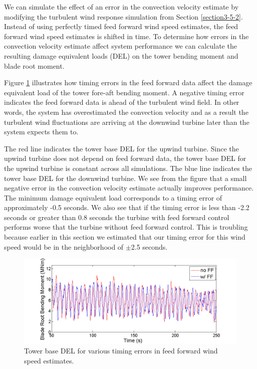 We can simulate the effect of an error in the convection velocity estimate by modifying the turbulent wind response simulation from Section \ref{section3-5-2}. Instead of using perfectly timed feed forward wind speed estimates, the feed forward wind speed estimates is shifted in time. To determine how errors in the convection velocity estimate affect system performance we can calculate the resulting damage equivalent loads (DEL) on the tower bending moment and blade root moment.

Figure \ref{fig3-36} illustrates how timing errors in the feed forward data affect the damage equivalent load of the tower fore-aft bending moment. A negative timing error indicates the feed forward data is ahead of the turbulent wind field. In other words, the system has overestimated the convection velocity and as a result the turbulent wind fluctuations are arriving at the downwind turbine later than the system expects them to. 

The red line indicates the tower base DEL for the upwind turbine. Since the upwind turbine does not depend on feed forward data, the tower base DEL for the upwind turbine is constant across all simulations. The blue line indicates the tower base DEL for the downwind turbine. We see from the figure that a small negative error in the convection velocity estimate actually improves performance. The minimum damage equivalent load corresponds to a timing error of approximately -0.5 seconds. We also see that if the timing error is less than -2.2 seconds or greater than 0.8 seconds the turbine with feed forward control performs worse that the turbine without feed forward control. This is troubling because earlier in this section we estimated that our timing error for this wind speed would be in the neighborhood of $\pm$2.5 seconds.

\begin{figure}[htbp]
	\centering
		\includegraphics[trim = {1cm 0 2cm 0}, clip, width = \linewidth]{Figures/ch3Figures/fig3-35.png}
		
	\caption{Tower base DEL for various timing errors in feed forward wind speed estimates.}
	\label{fig3-36}
\end{figure}

